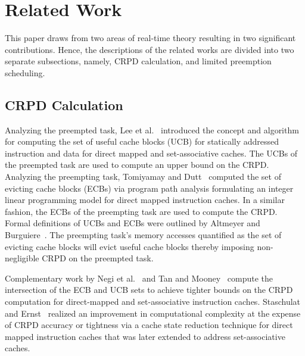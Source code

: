 \section{Related Work}\label{sec:related}
This paper draws from two areas of real-time theory resulting in two significant contributions. Hence, the descriptions of the related works are divided into two separate subsections, namely, CRPD calculation, and limited preemption scheduling.
\subsection {CRPD Calculation}\label{sec:crpd_related_work}
Analyzing the preempted task, Lee et al.~\cite{lee:96,lee:97,lee:98} introduced the concept and algorithm for computing the set of useful cache blocks (UCB) for statically addressed instruction and data for direct mapped and set-associative caches.
The UCBs of the preempted task are used to compute an upper bound on the CRPD.
\newline
\indent
Analyzing the preempting task, Tomiyamay and Dutt~\cite{tomiyamay:00} computed the set of evicting cache blocks (ECBs) via program path analysis formulating an integer linear programming model for direct mapped instruction caches.
In a similar fashion, the ECBs of the preempting task are used to compute the CRPD.
Formal definitions of UCBs and ECBs were outlined by Altmeyer and Burguiere~\cite{altmeyer:11c}.  The preempting task’s memory accesses quantified as the set of evicting cache blocks will evict useful cache blocks thereby imposing non-negligible CRPD on the preempted task.

Complementary work by Negi et al.~\cite{negi:03} and Tan and Mooney~\cite{tan:04} compute the intersection of the ECB and UCB sets to achieve tighter bounds on the CRPD computation for direct-mapped and set-associative instruction caches.
Staschulat and Ernst~\cite{staschulat:05c} realized an improvement in computational complexity at the expense of CRPD accuracy or tightness via a cache state reduction technique for direct mapped instruction caches that was later extended to address set-associative caches.

